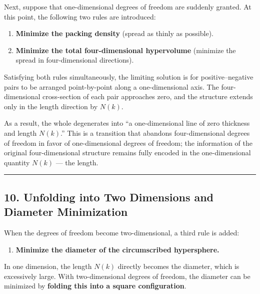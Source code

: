 \documentclass[a4paper,11pt]{article}
\theoremstyle{definition}
\providecommand{\tightlist}{\setlength{\itemsep}{0pt}\setlength{\parskip}{0pt}}
\begin{document}
Next, suppose that one-dimensional degrees of freedom are suddenly
granted. At this point, the following two rules are introduced:

\begin{enumerate}
\def\labelenumi{\arabic{enumi}.}
\tightlist
\item
  \textbf{Minimize the packing density} (spread as thinly as possible).
\item
  \textbf{Minimize the total four-dimensional hypervolume} (minimize the
  spread in four-dimensional directions).
\end{enumerate}

Satisfying both rules simultaneously, the limiting solution is for
positive--negative pairs to be arranged point-by-point along a
one-dimensional axis. The four-dimensional cross-section of each pair
approaches zero, and the structure extends only in the length direction
by \(N(k)\).

As a result, the whole degenerates into ``a one-dimensional line of zero
thickness and length \(N(k)\).'' This is a transition that abandons
four-dimensional degrees of freedom in favor of one-dimensional degrees
of freedom; the information of the original four-dimensional structure
remains fully encoded in the one-dimensional quantity \(N(k)\) --- the
length.

\begin{center}\rule{0.5\linewidth}{0.5pt}\end{center}

\subsection{10. Unfolding into Two Dimensions and Diameter
Minimization}\label{unfolding-into-two-dimensions-and-diameter-minimization}

When the degrees of freedom become two-dimensional, a third rule is
added:

\begin{enumerate}
\def\labelenumi{\arabic{enumi}.}
\setcounter{enumi}{2}
\tightlist
\item
  \textbf{Minimize the diameter of the circumscribed hypersphere.}
\end{enumerate}

In one dimension, the length \(N(k)\) directly becomes the diameter,
which is excessively large. With two-dimensional degrees of freedom, the
diameter can be minimized by \textbf{folding this into a square
configuration}.
\end{document}
